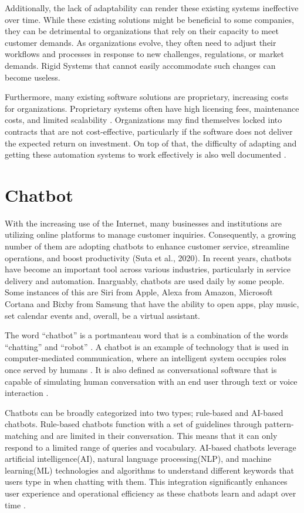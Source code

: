 Additionally, the lack of adaptability can render these existing systems ineffective over time. While these existing solutions might be beneficial to some companies, they can be detrimental to organizations that rely on their capacity to meet customer demands\cite{akkermans2003}. As organizations evolve, they often need to adjust their workflows and processes in response to new challenges, regulations, or market demands. Rigid Systems that cannot easily accommodate such changes can become useless. 

Furthermore, many existing software solutions are proprietary, increasing costs for organizations. Proprietary systems often have high licensing fees, maintenance costs, and limited scalability \cite{goel2012, prasad2013}. Organizations may find themselves locked into contracts that are not cost-effective, particularly if the software does not deliver the expected return on investment. On top of that, the difficulty of adapting and getting these automation systems to work effectively is also well documented \cite{adams2011, sarker2003, scott2000}.


\section{Chatbot}

With the increasing use of the Internet, many businesses and institutions are utilizing online platforms to manage customer inquiries. Consequently, a growing number of them are adopting chatbots to enhance customer service, streamline operations, and boost productivity (Suta et al., 2020). In recent years, chatbots have become an important tool across various industries, particularly in service delivery and automation. Inarguably, chatbots are used daily by some people. Some instances of this are Siri from Apple, Alexa from Amazon, Microsoft Cortana and Bixby from Samsung that have the ability to open apps, play music, set calendar events and, overall, be a virtual assistant.

The word “chatbot” is a portmanteau word that is a combination of the words “chatting” and “robot” \cite{rese2020}. A chatbot is an example of technology that is used in computer-mediated communication, where an intelligent system occupies roles once served by humans \cite{beattie2020}. It is also defined as conversational software that is capable of simulating human conversation with an end user through text or voice interaction \cite{Naruzzaman}.

Chatbots can be broadly categorized into two types; rule-based and AI-based chatbots. Rule-based chatbots function with a set of guidelines through pattern-matching and are limited in their conversation. This means that it can only respond to a limited range of queries and vocabulary. AI-based chatbots leverage artificial intelligence(AI), natural language processing(NLP), and machine learning(ML) technologies and algorithms to understand different keywords that users type in when chatting with them. This integration significantly enhances user experience and operational efficiency as these chatbots learn and adapt over time \cite{Kar2016}.

